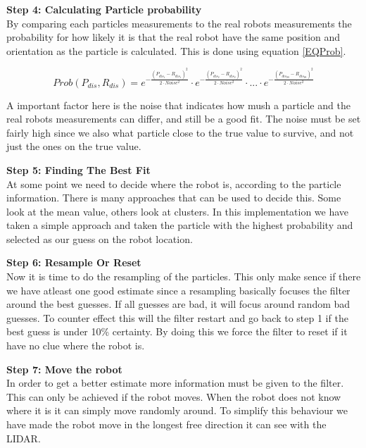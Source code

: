 \textbf{Step 4: Calculating Particle probability}\\

By comparing each particles measurements to the real robots measurements the probability for how likely it is that the real robot have the same position and orientation as the particle is calculated. This is done using equation \ref{EQProb}. 

\begin{equation}
	Prob(P_{dis},R_{dis})= e^{-{\frac{(P_{dis_1} - R_{dis_1})^2}{2 \cdot Noise^2}}} \cdot e^{-{\frac{(P_{dis_2} - R_{dis_2})^2}{2 \cdot Noise^2}}} \cdot ... \cdot e^{-{\frac{(P_{dis_{20}} - R_{dis_{20}})^2}{2 \cdot Noise^2}}}
\label{EQProb}
\end{equation}

A important factor here is the noise that indicates how mush a particle and the real robots measurements can differ, and still be a good fit. The noise must be set fairly high since we also what particle close to the true value to survive, and not just the ones on the true value. 

\textbf{Step 5: Finding The Best Fit}\\
At some point we need to decide where the robot is, according to the particle information. There is many approaches that can be used to decide this. Some look at the mean value, others look at clusters. In this implementation we have taken a simple approach and taken the particle with the highest probability and selected as our guess on the robot location. 

\textbf{Step 6: Resample Or Reset}\\
Now it is time to do the resampling of the particles. This only make sence if there we have atleast one good estimate since a resampling basically focuses the filter around the best guesses. If all guesses are bad, it will focus around random bad guesses. To counter effect this will the filter restart and go back to step 1 if the best guess is under 10\% certainty. By doing this we force the filter to reset if it have no clue where the robot is. 

\textbf{Step 7: Move the robot}\\
In order to get a better estimate more information must be given to the filter. This can only be achieved if the robot moves. When the robot does not know where it is it can simply move randomly around. To simplify this behaviour we have made the robot move in the longest free direction it can see with the LIDAR. 

